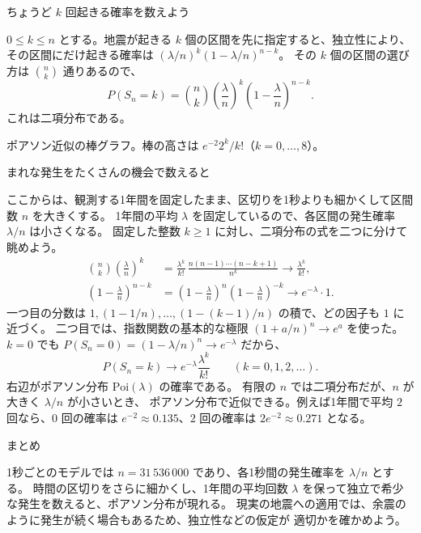 \documentclass[a4paper,10pt,pdflatex,ja=standard,jafont=ipaex-type1,
  magstyle=real,scale=1]{bxjsarticle}
\newcommand{\columnheading}[1]{\par\vspace{5pt}
  {\fontsize{11pt}{15pt}\selectfont\sffamily\mdseries\color{accent}#1}\par\vspace{2pt}}
\begin{document}
\columnheading{ちょうど $k$ 回起きる確率を数えよう}
$0\le k\le n$ とする。地震が起きる $k$ 個の区間を先に指定すると、独立性により、
その区間にだけ起きる確率は $(\lambda/n)^k(1-\lambda/n)^{n-k}$。
その $k$ 個の区間の選び方は $\binom nk$ 通りあるので、
$$
  P(S_n=k)=\binom nk\left(\frac{\lambda}{n}\right)^k
                  \left(1-\frac{\lambda}{n}\right)^{n-k}.
$$
これは二項分布である。

\begin{center}
\par
{\small\color{muted}ポアソン近似の棒グラフ。棒の高さは $e^{-2}2^k/k!$（$k=0,\ldots,8$）。}
\end{center}

\newpage
\columnheading{まれな発生をたくさんの機会で数えると}
ここからは、観測する1年間を固定したまま、区切りを1秒よりも細かくして区間数 $n$ を大きくする。
1年間の平均 $\lambda$ を固定しているので、各区間の発生確率 $\lambda/n$ は小さくなる。
固定した整数 $k\ge1$ に対し、二項分布の式を二つに分けて眺めよう。
$$
  \begin{aligned}
    \binom nk\left(\frac{\lambda}{n}\right)^k
      &=\frac{\lambda^k}{k!}\,
        \frac{n(n-1)\cdots(n-k+1)}{n^k}
        \longrightarrow\frac{\lambda^k}{k!},\\
    \left(1-\frac{\lambda}{n}\right)^{n-k}
      &=\left(1-\frac{\lambda}{n}\right)^n
        \left(1-\frac{\lambda}{n}\right)^{-k}
        \longrightarrow e^{-\lambda}\cdot1.
  \end{aligned}
$$
一つ目の分数は $1,(1-1/n),\ldots,(1-(k-1)/n)$ の積で、どの因子も $1$ に近づく。
二つ目では、指数関数の基本的な極限 $(1+a/n)^n\to e^a$ を使った。
$k=0$ でも $P(S_n=0)=(1-\lambda/n)^n\to e^{-\lambda}$ だから、
$$
  P(S_n=k)\longrightarrow e^{-\lambda}\frac{\lambda^k}{k!}
  \qquad(k=0,1,2,\ldots).
$$
右辺がポアソン分布 $\mathrm{Poi}(\lambda)$ の確率である。
有限の $n$ では二項分布だが、$n$ が大きく $\lambda/n$ が小さいとき、
ポアソン分布で近似できる。例えば1年間で平均 $2$ 回なら、$0$ 回の確率は
$e^{-2}\approx0.135$、$2$ 回の確率は $2e^{-2}\approx0.271$ となる。

\columnheading{まとめ}
1秒ごとのモデルでは $n=31\,536\,000$ であり、各1秒間の発生確率を $\lambda/n$ とする。
時間の区切りをさらに細かくし、1年間の平均回数 $\lambda$ を保って独立で希少な発生を数えると、ポアソン分布が現れる。
現実の地震への適用では、余震のように発生が続く場合もあるため、独立性などの仮定が
適切かを確かめよう。

\label{lastpage}
\end{document}
